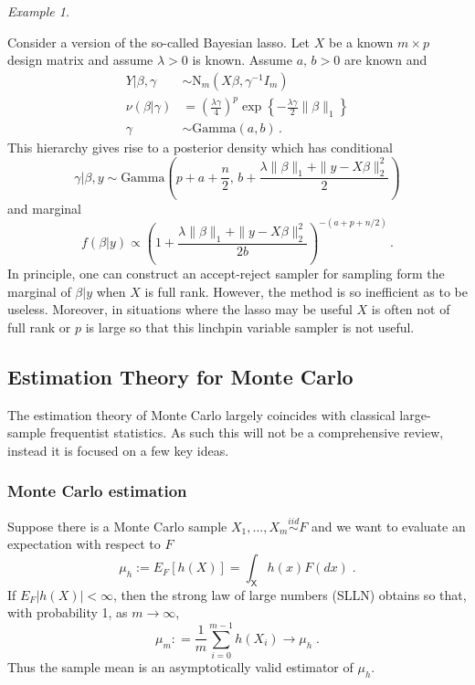 \documentclass[12pt]{article}
\theoremstyle{plain}
\theoremstyle{definition}
\theoremstyle{remark}
\newtheorem{example}{Example}[section]
\newcommand{\sX}{\mathsf{X}}
\begin{document}
\begin{example}
  \label{gofmc:ex:Bayesian lasso}
  
  Consider a version of the so-called Bayesian lasso. Let $X$ be a
  known $m \times p$ design matrix and assume $\lambda > 0$ is known.
  Assume $a, \, b >0$ are known and
\begin{align*}
Y|\beta, \gamma & \sim \text{N}_{m}(X\beta, \gamma^{-1}I_{m}) \\
\nu(\beta|\gamma) & = \left(\frac{\lambda \gamma}{4}\right)^{p}
                    \exp\left\{ -\frac{\lambda \gamma}{2}
                    \|\beta\|_{1}\right\}\\ 
\gamma & \sim \text{Gamma}(a,b) \, .
\end{align*}
This hierarchy gives rise to a posterior density which has conditional 
$$
\gamma | \beta, y \sim \text{Gamma} \left(p + a + \frac{n}{2}, \, b +
  \frac{\lambda \|\beta\|_{1} + \|y- X\beta \|_{2}^{2}}{2}\right) 
$$
and marginal
$$
f(\beta | y) \propto \left(1 + \frac{\lambda \|\beta\|_{1} + \|y-
    X\beta \|_{2}^{2}}{2b}\right)^{-(a + p + n/2)} \, . 
$$
In principle, one can construct an accept-reject sampler for sampling
form the marginal of $\beta|y$ when $X$ is full rank.  However, the
method is so inefficient as to be useless.  Moreover, in situations
where the lasso may be useful $X$ is often not of full rank or $p$ is
large so that this linchpin variable sampler is not useful.
\end{example}

\subsection{Estimation Theory for Monte Carlo}
\label{gofmc:sec:Theory}

The estimation theory of Monte Carlo largely coincides with
classical large-sample frequentist statistics.  As such this will not
be a comprehensive review, instead it is focused on a few key ideas.

\subsubsection{Monte Carlo estimation}

Suppose there is a Monte Carlo sample
$X_{1},\ldots, X_{m} \stackrel{iid}{\sim} F$ and we want to evaluate
an expectation with respect to $F$
\[
\mu_{h} := E_{F} [h (X)] = \int_{\sX} h(x) F(dx) \; .
\]
If $E_{F}|h(X)| < \infty$, then the strong law of large numbers (SLLN)
obtains so that, with probability 1, as $m \to \infty$,
\begin{equation}
\label{gofmc:eq:iid slln}
\mu_{m} : = \frac{1}{m} \sum_{i=0}^{m-1} h(X_{i}) \to \mu_{h} \; .
\end{equation}
Thus the sample mean is an asymptotically valid estimator of $\mu_h$.
\end{document}
